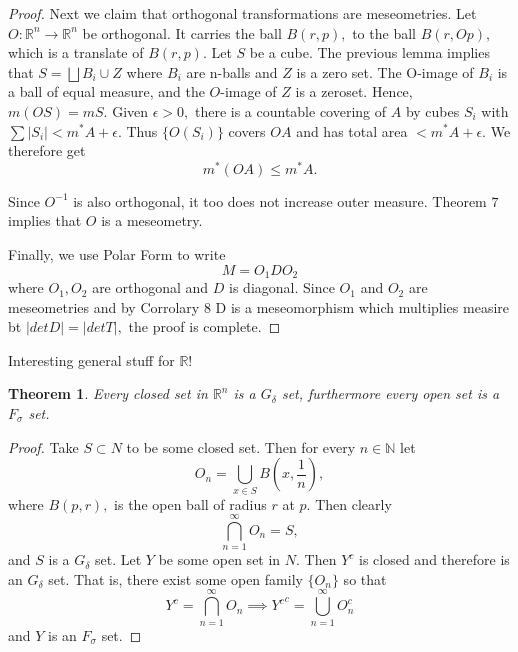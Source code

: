 \documentclass[letter]{article}
\newtheorem{theorem}{Theorem}
\newenvironment{menumerate}{%
  \edef\backupindent{\the\parindent}%
  \enumerate%
  \setlength{\parindent}{\backupindent}%
}{\endenumerate}
\begin{document}
\begin{menumerate}
\begin{proof}
		Next we claim that orthogonal transformations are meseometries. Let $O:\mathbb{R}^n \to \mathbb{R}^n$ be orthogonal. It carries the ball $B(r,p),$ to the ball $B(r, Op),$ which is a translate of $B(r,p).$ Let $S$ be a cube. The previous lemma implies that $S = \bigsqcup B_i \cup Z$ where $B_i$ are n-balls and $Z$ is a zero set. The O-image of $B_i$ is
		a ball of equal measure, and the $O$-image of $Z$ is a zeroset. Hence,
		$m(OS) = mS.$ Given $\epsilon > 0,$ there is a countable covering of $A$ by cubes $S_i$ with $\sum |S_i| < m^*A + \epsilon$. Thus $\{O(S_i)\}$ covers $OA$ and has total area $< m^*A + \epsilon.$ We therefore get
		\begin{equation}
		  	m^*(OA) \leq m^*A.
		  \end{equation}  

		Since $O^{-1}$ is also orthogonal, it too does not increase outer measure. Theorem $7$ implies that $O$ is a meseometry.

		Finally, we use Polar Form to write
		\begin{equation}
			M = O_1 D O_2
		\end{equation}
		where $O_1, O_2$ are orthogonal and $D$ is diagonal. Since $O_1$ and $O_2$ are meseometries and by Corrolary $8$ D is a meseomorphism which multiplies measire bt $|det D| =|det T|,$ the proof is complete. 
	\end{proof}
	\item Interesting general stuff for $\mathbb{R}!$
	\begin{theorem}
		Every closed set in $\mathbb{R}^n$ is a $G_\delta$ set, furthermore
		every open set is a $F_\sigma$ set.
	\end{theorem}
	\begin{proof}
		Take $S \subset N$ to be some closed set. Then for every $n\in \mathbb{N}$
		let 
		\begin{equation}
			O_n = \bigcup_{x \in S} B\left(x, \frac{1}{n}\right),	
		\end{equation}
		where $B(p,r),$ is the open ball of radius $r$ at $p.$
		Then clearly \begin{equation}
			\bigcap_{n=1}^\infty O_n = S,
		\end{equation}
		and $S$ is a $G_\delta$ set. Let $Y$ be some open set in $N.$ Then
		$Y^c$ is closed and therefore is an $G_\delta$ set. That is, there exist
		some open family $\{O_n\}$ so
		that 
		\begin{equation}
				Y^c = \bigcap_{n=1}^\infty O_n \implies {Y^c}^c = \bigcup_{n=1}^\infty O_n^c
		\end{equation}
		and $Y$ is an $F_\sigma$ set.
	\end{proof}
\end{menumerate} 
\end{document}
